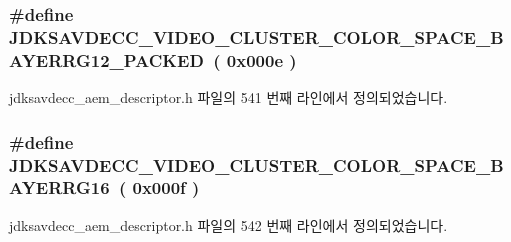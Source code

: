 \subsubsection[{\texorpdfstring{J\+D\+K\+S\+A\+V\+D\+E\+C\+C\+\_\+\+V\+I\+D\+E\+O\+\_\+\+C\+L\+U\+S\+T\+E\+R\+\_\+\+C\+O\+L\+O\+R\+\_\+\+S\+P\+A\+C\+E\+\_\+\+B\+A\+Y\+E\+R\+R\+G12\+\_\+\+P\+A\+C\+K\+ED}{JDKSAVDECC_VIDEO_CLUSTER_COLOR_SPACE_BAYERRG12_PACKED}}]{\setlength{\rightskip}{0pt plus 5cm}\#define J\+D\+K\+S\+A\+V\+D\+E\+C\+C\+\_\+\+V\+I\+D\+E\+O\+\_\+\+C\+L\+U\+S\+T\+E\+R\+\_\+\+C\+O\+L\+O\+R\+\_\+\+S\+P\+A\+C\+E\+\_\+\+B\+A\+Y\+E\+R\+R\+G12\+\_\+\+P\+A\+C\+K\+ED~( 0x000e )}\hypertarget{group__video__cluster__color__space_gac99ddf5787e9a221f8a40e95e98bee89}{}\label{group__video__cluster__color__space_gac99ddf5787e9a221f8a40e95e98bee89}


jdksavdecc\+\_\+aem\+\_\+descriptor.\+h 파일의 541 번째 라인에서 정의되었습니다.

\subsubsection[{\texorpdfstring{J\+D\+K\+S\+A\+V\+D\+E\+C\+C\+\_\+\+V\+I\+D\+E\+O\+\_\+\+C\+L\+U\+S\+T\+E\+R\+\_\+\+C\+O\+L\+O\+R\+\_\+\+S\+P\+A\+C\+E\+\_\+\+B\+A\+Y\+E\+R\+R\+G16}{JDKSAVDECC_VIDEO_CLUSTER_COLOR_SPACE_BAYERRG16}}]{\setlength{\rightskip}{0pt plus 5cm}\#define J\+D\+K\+S\+A\+V\+D\+E\+C\+C\+\_\+\+V\+I\+D\+E\+O\+\_\+\+C\+L\+U\+S\+T\+E\+R\+\_\+\+C\+O\+L\+O\+R\+\_\+\+S\+P\+A\+C\+E\+\_\+\+B\+A\+Y\+E\+R\+R\+G16~( 0x000f )}\hypertarget{group__video__cluster__color__space_ga60ca7fa49e3f6ab22dee47d2cbea561d}{}\label{group__video__cluster__color__space_ga60ca7fa49e3f6ab22dee47d2cbea561d}


jdksavdecc\+\_\+aem\+\_\+descriptor.\+h 파일의 542 번째 라인에서 정의되었습니다.

